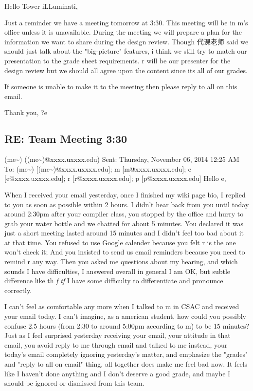 \documentclass[12pt]{book}
\begin{document}
Hello Tower iLLuminati,

Just a reminder we have a meeting tomorrow at 3:30. This meeting will be in m's office unless it is unavailable. During the meeting we will prepare a plan for the information we want to share during the design review. Though 代课老师 said we should just talk about the "big-picture" features, i think we still try to match our presentation to the grade sheet requirements. r will be our presenter for the design review but we should all agree upon the content since its all of our grades.

If someone is unable to make it to the meeting then please reply to all on this email. 

Thank you,
?e

\subsection{RE: Team Meeting 3:30}
\label{sec-18-2-4}
(me\textasciitilde{}) ((me\textasciitilde{})@xxxx.uxxxx.edu)
Sent:        Thursday, November 06, 2014 12:25 AM
To:        
(me\textasciitilde{}) [(me\textasciitilde{})@xxxx.uxxxx.edu]; m [m@xxxx.uxxxx.edu]; e [e@xxxx.uxxxx.edu]; r [r@xxxx.uxxxx.edu]; p [p@xxxx.uxxxx.edu]
Hello e, 

When I received your email yesterday, once I finished my wiki page bio, I replied to you as soon as possible within 2 hours. I didn't hear back from you until today around 2:30pm after your compiler class, you stopped by the office and hurry to grab your water bottle and we chatted for about 5 minutes. You declared it was just a short meeting lasted around 15 minutes and I didn't feel too bad about it at that time. You refused to use Google calender because you felt r is the one won't check it; And you insisted to send us email reminders because you need to remind r any way. Then you asked me questions about my hearing, and which sounds I have difficulties, I answered overall in general I am OK, but subtle difference like th \emph{f} \emph{tf} I have some difficulty to differentiate and pronounce correctly. 

I can't feel as comfortable any more when I talked to m in CSAC and received your email today. I can't imagine, as a american student, how could you possibly confuse 2.5 hours (from 2:30 to around 5:00pm according to m) to be 15 minutes? Just as I feel surprised yesterday receiving your email, your attitude in that email, you avoid reply to me through email and talked to me instead, your today's email completely ignoring yesterday's matter, and emphasize the "grades" and "reply to all on email" thing, all together does make me feel bad now. It feels like I haven't done anything and I don't deserve a good grade, and maybe I should be ignored or dismissed from this team. 
\end{document}
